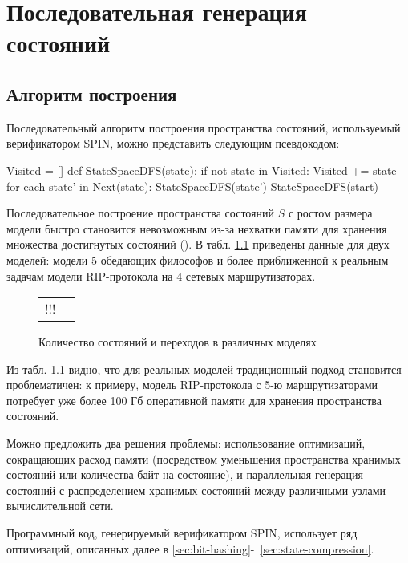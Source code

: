 \chapter{Последовательная генерация состояний}
\label{sec:seq-statespace}

\section{Алгоритм построения}
\label{sec:seq-algo}

Последовательный алгоритм построения пространства состояний,
используемый верификатором SPIN, можно представить следующим
псевдокодом:

\begin{CodeBlock}
Visited = []
def StateSpaceDFS(state):
    if not state in Visited:
        Visited += state
        for each state' in Next(state):
            StateSpaceDFS(state')
StateSpaceDFS(start)
\end{CodeBlock}

Последовательное построение пространства состояний $S$ с ростом
размера модели быстро становится невозможным из-за нехватки памяти для
хранения множества достигнутых состояний (). В
табл. \ref{fig:models-statecount} приведены данные для двух моделей:
модели 5 обедающих философов и более приближенной к реальным задачам
модели RIP-протокола на 4 сетевых маршрутизаторах.

\begin{figure}
  \centering
  \begin{tabular}{r|l}
    !!! \\  
  \end{tabular}
  \caption{Количество состояний и переходов в различных моделях}
\label{fig:models-statecount}
\end{figure}

Из табл. \ref{fig:models-statecount} видно, что для реальных моделей
традиционный подход становится проблематичен: к примеру, модель
RIP-протокола с 5-ю маршрутизаторами потребует уже более 100 Гб
оперативной памяти для хранения пространства состояний. 

Можно предложить два решения проблемы: использование оптимизаций,
сокращающих расход памяти (посредством уменьшения пространства
хранимых состояний или количества байт на состояние), и параллельная
генерация состояний с распределением хранимых состояний между
различными узлами вычислительной сети.

Программный код, генерируемый верификатором SPIN, использует ряд
оптимизаций, описанных далее в \ref{sec:bit-hashing}-~\ref{sec:state-compression}.

